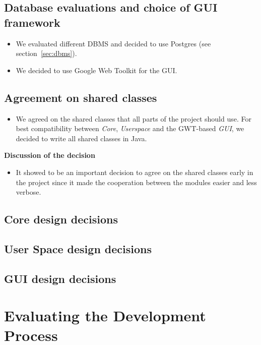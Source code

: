 \subsection{Database evaluations and choice of GUI framework}

\begin{itemize}
	\item We evaluated different DBMS and decided to use Postgres (see section~\ref{sec:dbms}).
	\item We decided to use Google Web Toolkit for the GUI.

\end{itemize}


\subsection{Agreement on shared classes}

\begin{itemize}
	\item We agreed on the shared classes that all parts of the project should use. For best compatibility between  \emph{Core}, \emph{Userspace} and the GWT-based \emph{GUI}, we decided to write all shared classes in Java.
\end{itemize}


\noindent\textbf{Discussion of the decision}

\begin{itemize}
	\item It showed to be an important decision to agree on the shared classes early in the project since it made the cooperation between the modules easier and less verbose.
\end{itemize}


\subsection{Core design decisions}



\subsection{User Space design decisions}



\subsection{GUI design decisions}

\section{Evaluating the Development Process}

